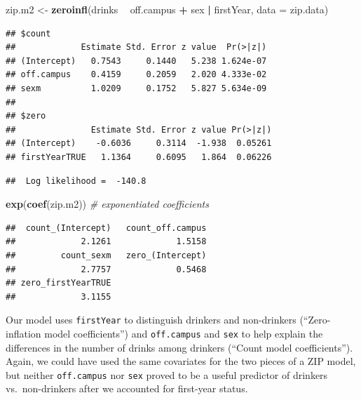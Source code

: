 \documentclass[
]{krantz}
\newenvironment{Shaded}{\begin{snugshade}}{\end{snugshade}}
\newcommand{\CommentTok}[1]{\textcolor[rgb]{0.37,0.37,0.37}{\textit{#1}}}
\newcommand{\DataTypeTok}[1]{\textcolor[rgb]{0.27,0.27,0.27}{#1}}
\newcommand{\KeywordTok}[1]{\textcolor[rgb]{0.27,0.27,0.27}{\textbf{#1}}}
\newcommand{\NormalTok}[1]{#1}
\newcommand{\OperatorTok}[1]{\textcolor[rgb]{0.43,0.43,0.43}{\textbf{#1}}}
\newcommand{\StringTok}[1]{\textcolor[rgb]{0.5,0.5,0.5}{#1}}
\begin{document}
\begin{Shaded}
\begin{Highlighting}[]
\NormalTok{zip.m2 <-}\StringTok{ }\KeywordTok{zeroinfl}\NormalTok{(drinks }\OperatorTok{~}\StringTok{ }\NormalTok{off.campus }\OperatorTok{+}\StringTok{ }\NormalTok{sex }\OperatorTok{|}\StringTok{ }\NormalTok{firstYear, }
                   \DataTypeTok{data =}\NormalTok{ zip.data)}
\end{Highlighting}
\end{Shaded}

\begin{verbatim}
## $count
##             Estimate Std. Error z value  Pr(>|z|)
## (Intercept)   0.7543     0.1440   5.238 1.624e-07
## off.campus    0.4159     0.2059   2.020 4.333e-02
## sexm          1.0209     0.1752   5.827 5.634e-09
## 
## $zero
##               Estimate Std. Error z value Pr(>|z|)
## (Intercept)    -0.6036     0.3114  -1.938  0.05261
## firstYearTRUE   1.1364     0.6095   1.864  0.06226
\end{verbatim}

\begin{verbatim}
##  Log likelihood =  -140.8
\end{verbatim}

\begin{Shaded}
\begin{Highlighting}[]
\KeywordTok{exp}\NormalTok{(}\KeywordTok{coef}\NormalTok{(zip.m2))   }\CommentTok{# exponentiated coefficients}
\end{Highlighting}
\end{Shaded}

\begin{verbatim}
##  count_(Intercept)   count_off.campus 
##             2.1261             1.5158 
##         count_sexm   zero_(Intercept) 
##             2.7757             0.5468 
## zero_firstYearTRUE 
##             3.1155
\end{verbatim}

Our model uses \texttt{firstYear} to distinguish drinkers and non-drinkers (``Zero-inflation model coefficients'') and \texttt{off.campus} and \texttt{sex} to help explain the differences in the number of drinks among drinkers (``Count model coefficients''). Again, we could have used the same covariates for the two pieces of a ZIP model, but neither \texttt{off.campus} nor \texttt{sex} proved to be a useful predictor of drinkers vs.~non-drinkers after we accounted for first-year status.
\end{document}
